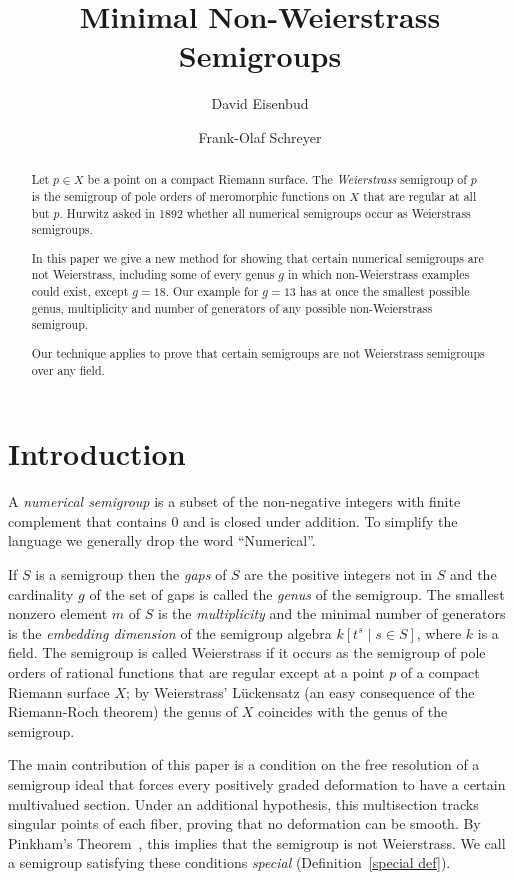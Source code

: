 \documentclass[twoside,12pt, leqno]{amsart}
\author[David Eisenbud]{David Eisenbud}
\author[Frank-Olaf Schreyer]{Frank-Olaf Schreyer}
\title{Minimal  Non-Weierstrass Semigroups}
\theoremstyle{definition}
\begin{document}
\begin{abstract}
Let $p\in X$ be a point on a compact Riemann surface. The \emph{Weierstrass} semigroup of $p$ is  the semigroup of pole orders
of meromorphic functions on $X$ that are regular at all but $p$. Hurwitz asked in 1892 
whether all numerical semigroups occur as Weierstrass semigroups. 

In this paper we give a new method  for showing that certain numerical semigroups are not Weierstrass, including some
of every genus $g$ in which non-Weierstrass examples could exist, except $g =18$. Our example for $g=13$ has at once the smallest possible genus, multiplicity
and number of generators of any possible non-Weierstrass semigroup.
 
 Our technique applies to prove that certain semigroups are not Weierstrass semigroups over any field. 
\end{abstract}
\maketitle

\section*{Introduction}

A \emph{numerical semigroup} is a subset of the non-negative integers
with finite complement that contains 0 and is closed under addition. To simplify the
language we generally drop the word ``Numerical''. 

If $S$ is a semigroup then the \emph{gaps} of $S$ are the positive integers
not in $S$ and the cardinality $g$ of the set of gaps is called
the \emph{genus} of the semigroup. The smallest nonzero element $m$ of $S$
is the \emph{multiplicity} and the minimal number of generators is the
\emph{ embedding dimension}  of the semigroup algebra
$k[t^{s} \mid s\in S]$, where $k$ is a field. The semigroup is called Weierstrass if
it occurs as the semigroup of pole orders of rational functions that are regular
except at a point $p$ of a compact Riemann surface $X$; by Weierstrass' L\"uckensatz (an easy consequence of the Riemann-Roch theorem) the genus
of $X$ coincides with the genus of the semigroup. 

The main contribution of this paper is a condition  on the free resolution of a semigroup ideal that forces every positively graded deformation to have a certain multivalued
section.  Under an additional hypothesis, this multisection tracks singular points of each fiber, proving
that no deformation can be smooth. By Pinkham's Theorem~\cite[Chapter IV]{MR376672}, this implies that the semigroup is not Weierstrass. We call a semigroup satisfying these conditions \emph{special} (Definition~\ref{special def}).
\end{document}
